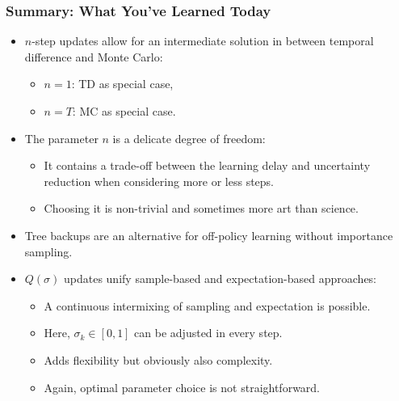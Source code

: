 \begin{frame}
\frametitle{Summary: What You've Learned Today}
\begin{itemize}
	\item $n$-step updates allow for an intermediate solution in between temporal difference and Monte Carlo:
	\begin{itemize}
		\item $n=1$: TD as special case,
		\item $n=T$: MC as special case.
	\end{itemize}\pause
	\item The parameter $n$ is a delicate degree of freedom:
	\begin{itemize}
		\item It contains a trade-off between the learning delay and uncertainty reduction when considering more or less steps.
		\item Choosing it is non-trivial and sometimes more art than science.
	\end{itemize}\pause
	\item Tree backups are an alternative for off-policy learning without importance sampling.\pause
	\item $Q(\sigma)$ updates unify sample-based and expectation-based approaches:
	\begin{itemize}
		\item A continuous intermixing of sampling and expectation is possible.
		\item Here, $\sigma_k \in [0,1]$ can be adjusted in every step.
		\item Adds flexibility but obviously also complexity.
		\item Again, optimal parameter choice is not straightforward.
	\end{itemize}
\end{itemize}
\end{frame}
